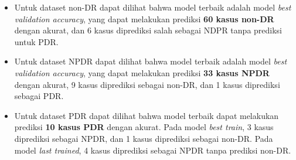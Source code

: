 \begin{itemize}
	\item Untuk dataset non-DR dapat dilihat bahwa model terbaik adalah model \emph{best validation accuracy}, yang dapat melakukan prediksi \textbf{60 kasus non-DR} dengan akurat, dan 6 kasus diprediksi salah sebagai NDPR tanpa prediksi untuk PDR.
	
	\item Untuk dataset NPDR dapat dilihat bahwa model terbaik adalah model \emph{best validation accuracy}, yang dapat melakukan prediksi \textbf{33 kasus NPDR} dengan akurat, 9 kasus diprediksi sebagai non-DR, dan 1 kasus diprediksi sebagai PDR.
	
	\item Untuk dataset PDR dapat dilihat bahwa model terbaik dapat melakukan prediksi \textbf{10 kasus PDR} dengan akurat. Pada model \emph{best train}, 3 kasus diprediksi sebagai NPDR, dan 1 kasus diprediksi sebagai non-DR. Pada model \emph{last trained}, 4 kasus diprediksi sebagai NPDR tanpa prediksi non-DR.
\end{itemize}
\pagebreak


